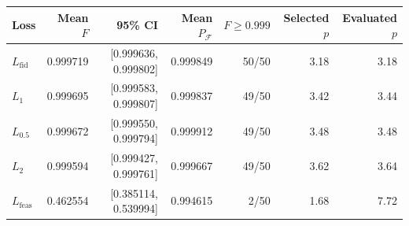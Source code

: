\begin{tabular}{lrrrrrr}
\toprule
Loss & Mean $F$ & 95\% CI & Mean $P_{\mathcal F}$ & $F\geq0.999$ & Selected $p$ & Evaluated $p$ \\
\midrule
$L_{\mathrm{fid}}$ & 0.999719 & [0.999636, 0.999802] & 0.999849 & 50/50 & 3.18 & 3.18 \\
$L_1$ & 0.999695 & [0.999583, 0.999807] & 0.999837 & 49/50 & 3.42 & 3.44 \\
$L_{0.5}$ & 0.999672 & [0.999550, 0.999794] & 0.999912 & 49/50 & 3.48 & 3.48 \\
$L_2$ & 0.999594 & [0.999427, 0.999761] & 0.999667 & 49/50 & 3.62 & 3.64 \\
$L_{\mathrm{feas}}$ & 0.462554 & [0.385114, 0.539994] & 0.994615 & 2/50 & 1.68 & 7.72 \\
\bottomrule
\end{tabular}
